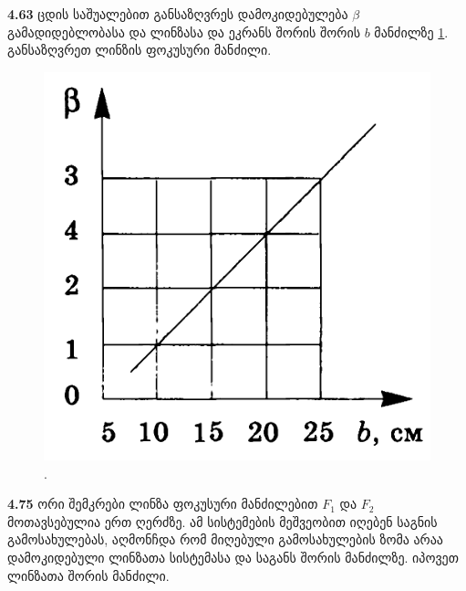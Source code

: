 \documentclass[a4paper]{book}
\begin{document}
\textbf{4.63} ცდის საშუალებით განსაზღვრეს დამოკიდებულება $\beta$ გამადიდებლობასა და ლინზასა და ეკრანს შორის შორის $b$ მანძილზე \ref{fig:4_63}. განსაზღვრეთ ლინზის ფოკუსური მანძილი.
		\begin{figure}[h]
		   \centering
           \includegraphics[width=0.4\columnwidth]{figures/4_63}
           \caption{.}
           \label{fig:4_63}
        \end{figure}
\textbf{4.75} ორი შემკრები ლინზა ფოკუსური მანძილებით $F_1$ და $F_2$ მოთავსებულია ერთ ღერძზე. ამ სისტემების მეშვეობით იღებენ საგნის გამოსახულებას, აღმონჩდა რომ მიღებული გამოსახულების ზომა არაა დამოკიდებული ლინზათა სისტემასა და საგანს შორის მანძილზე. იპოვეთ ლინზათა შორის მანძილი. 
\end{document}
